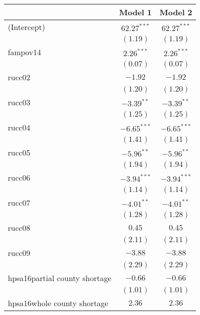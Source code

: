 
\begin{table}
\begin{center}
\begin{tabular}{l c c}
\hline
 & Model 1 & Model 2 \\
\hline
(Intercept)                   & $62.27^{***}$ & $62.27^{***}$ \\
                              & $(1.19)$      & $(1.19)$      \\
fampov14                      & $2.26^{***}$  & $2.26^{***}$  \\
                              & $(0.07)$      & $(0.07)$      \\
rucc02                        & $-1.92$       & $-1.92$       \\
                              & $(1.20)$      & $(1.20)$      \\
rucc03                        & $-3.39^{**}$  & $-3.39^{**}$  \\
                              & $(1.25)$      & $(1.25)$      \\
rucc04                        & $-6.65^{***}$ & $-6.65^{***}$ \\
                              & $(1.41)$      & $(1.41)$      \\
rucc05                        & $-5.96^{**}$  & $-5.96^{**}$  \\
                              & $(1.94)$      & $(1.94)$      \\
rucc06                        & $-3.94^{***}$ & $-3.94^{***}$ \\
                              & $(1.14)$      & $(1.14)$      \\
rucc07                        & $-4.01^{**}$  & $-4.01^{**}$  \\
                              & $(1.28)$      & $(1.28)$      \\
rucc08                        & $0.45$        & $0.45$        \\
                              & $(2.11)$      & $(2.11)$      \\
rucc09                        & $-3.88$       & $-3.88$       \\
                              & $(2.29)$      & $(2.29)$      \\
hpsa16partial county shortage & $-0.66$       & $-0.66$       \\
                              & $(1.01)$      & $(1.01)$      \\
hpsa16whole county shortage   & $2.36$        & $2.36$        \\

\end{tabular}
\end{center}
\end{table}
